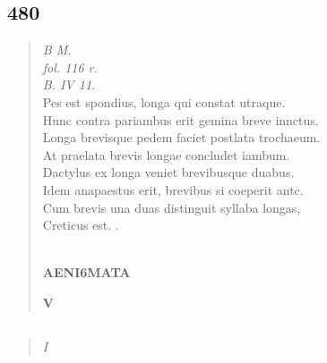 \documentclass[11pt, a4paper]{report}
\begin{document}
            \subsection*{480}
      \begin{verse}
      \textit{B M.} \\ \textit{fol. 116 r.} \\ \textit{B. IV 11.} \\ Pes est spondius, longa qui constat utraque. \\ Hunc contra pariambus erit gemina breve innctus. \\ Longa brevisque pedem faciet postlata trochaeum. \\ At praelata brevis longae concludet iambum. \\ Dactylus ex longa veniet brevibusque duabus. \\ Idem anapaestus erit, brevibus si coeperit antc. \\ Cum brevis una duas distinguit syllaba longas, \\ Creticus est. . \\ 
        ﻿\pagebreak 
    \begin{center} \textbf{AENI6MATA} \end{center}\begin{center} \textbf{V} \end{center}
      \end{verse}
  
            \subsection*{}
      \begin{verse}
      \textit{I} \\ 
      \end{verse}
  
\end{document}
